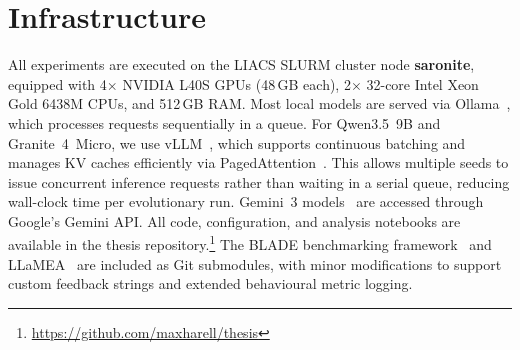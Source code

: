 \section{Infrastructure}
\label{sec:meth-infrastructure}

All experiments are executed on the LIACS SLURM cluster node \textbf{saronite}, equipped with 4$\times$ NVIDIA L40S GPUs (48\,GB each), 2$\times$ 32-core Intel Xeon Gold 6438M CPUs, and 512\,GB RAM. Most local models are served via Ollama~\cite{ollama}, which processes requests sequentially in a queue. For Qwen3.5~9B and Granite~4~Micro, we use vLLM~\cite{kwon2023vllm}, which supports continuous batching and manages KV caches efficiently via PagedAttention~\cite{kwon2023vllm}. This allows multiple seeds to issue concurrent inference requests rather than waiting in a serial queue, reducing wall-clock time per evolutionary run. Gemini~3 models~\cite{gemini3pro, gemini3flash} are accessed through Google's Gemini API. All code, configuration, and analysis notebooks are available in the thesis repository.\footnote{\url{https://github.com/maxharell/thesis}} The BLADE benchmarking framework~\cite{vanStein2025BLADE} and LLaMEA~\cite{vanStein2024LLaMEA} are included as Git submodules, with minor modifications to support custom feedback strings and extended behavioural metric logging.
